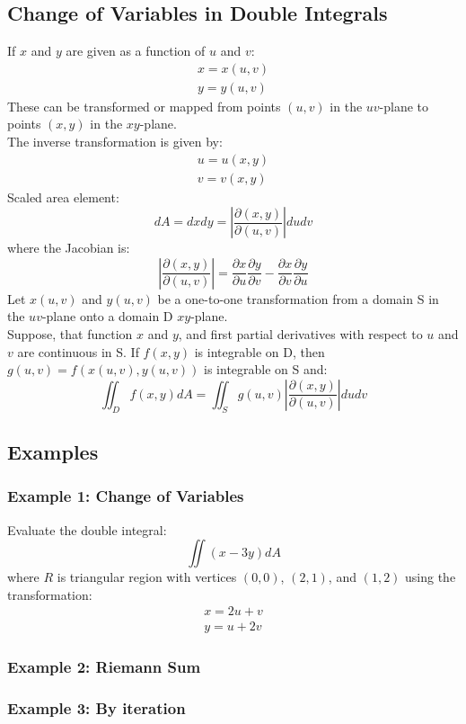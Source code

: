 \subsection{Change of Variables in Double Integrals}
If $x$ and $y$ are given as a function of $u$ and $v$:
$$\begin{array}{c}
x=x(u,v)\\
y=y(u,v)
\end{array}$$
These can be transformed or mapped from points $(u,v)$ in the $uv$-plane to points $(x,y)$ in the $xy$-plane.\\
The inverse transformation is given by:
$$\begin{array}{c}
  u=u(x,y)\\
  v=v(x,y)
\end{array}$$
Scaled area element:
$$dA = dxdy=\left|\frac{\partial(x,y)}{\partial(u,v)}\right|dudv$$
where the Jacobian is:
$$\left|\frac{\partial(x,y)}{\partial(u,v)}\right|=\frac{\partial x}{\partial u}\frac{\partial y}{\partial v}-\frac{\partial x}{\partial v}\frac{\partial y}{\partial u}$$
Let $x(u, v)$ and $y(u,v)$ be a one-to-one transformation from a domain S in the $uv$-plane onto a domain D
$xy$-plane.\\
Suppose, that function $x$ and $y$, and first partial derivatives with respect to $u$ and $v$ are continuous in S.
If $f(x,y)$ is integrable on D, then $g(u,v)=f(x(u,v),y(u,v))$ is integrable on S and:
$$\iint_D f(x,y)dA=\iint_S g(u,v)\left|\frac{\partial(x,y)}{\partial(u,v)}\right|dudv$$

\subsection{Examples}
\subsubsection{Example 1: Change of Variables}
Evaluate the double integral:
$$\iint (x-3y)dA$$
where $R$ is triangular region with vertices $(0,0)$, $(2,1)$, and $(1,2)$ using the transformation:
$$\begin{array}{c}
  x=2u+v\\
  y=u+2v
\end{array}$$

\subsubsection{Example 2: Riemann Sum}
\subsubsection{Example 3: By iteration}
